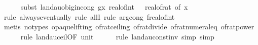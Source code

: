 \begin{isabellebody}
\ \ \ \ \isamarkupfalse%
\ {\isacharparenleft}{\kern0pt}subst\ landau{\isacharunderscore}{\kern0pt}o{\isachardot}{\kern0pt}big{\isachardot}{\kern0pt}in{\isacharunderscore}{\kern0pt}cong{\isacharbrackleft}{\kern0pt}\ g{\isacharequal}{\kern0pt}{\isachardoublequoteopen}{\isasymlambda}x{\isachardot}{\kern0pt}\ real{\isacharunderscore}{\kern0pt}of{\isacharunderscore}{\kern0pt}int\ {\isasymlceil}{}\ {\isacharslash}{\kern0pt}\ {\isacharparenleft}{\kern0pt}real{\isacharunderscore}{\kern0pt}of{\isacharunderscore}{\kern0pt}rat\ {\isacharparenleft}{\kern0pt}{\isasymdelta}{\isacharunderscore}{\kern0pt}of\ x{\isacharparenright}{\kern0pt}{\isacharparenright}{\kern0pt}\isanewline
\ \ \ \ \isamarkupfalse%
\ {\isacharparenleft}{\kern0pt}rule\ always{\isacharunderscore}{\kern0pt}eventually{\isacharcomma}{\kern0pt}\ rule\ allI{\isacharcomma}{\kern0pt}\ rule\ arg{\isacharunderscore}{\kern0pt}cong{\isacharbrackleft}{\kern0pt}\ f{\isacharequal}{\kern0pt}{\isachardoublequoteopen}real{\isacharunderscore}{\kern0pt}of{\isacharunderscore}{\kern0pt}int{\isachardoublequoteclose}{\isacharbrackright}{\kern0pt}{\isacharparenright}{\kern0pt}\ \isanewline
\ \ \ \ \ \isamarkupfalse%
\ {\isacharparenleft}{\kern0pt}metis\ {\isacharparenleft}{\kern0pt}no{\isacharunderscore}{\kern0pt}types{\isacharcomma}{\kern0pt}\ opaque{\isacharunderscore}{\kern0pt}lifting{\isacharparenright}{\kern0pt}\ of{\isacharunderscore}{\kern0pt}rat{\isacharunderscore}{\kern0pt}ceiling\ of{\isacharunderscore}{\kern0pt}rat{\isacharunderscore}{\kern0pt}divide\ of{\isacharunderscore}{\kern0pt}rat{\isacharunderscore}{\kern0pt}numeral{\isacharunderscore}{\kern0pt}eq\ of{\isacharunderscore}{\kern0pt}rat{\isacharunderscore}{\kern0pt}power{\isacharparenright}{\kern0pt}\isanewline
\ \ \ \ \isamarkupfalse%
\ {\isacharparenleft}{\kern0pt}rule\ landau{\isacharunderscore}{\kern0pt}ceil{\isacharbrackleft}{\kern0pt}OF\ unit{\isacharunderscore}{\kern0pt}{}{\isacharbrackright}{\kern0pt}{\isacharparenright}{\kern0pt}\isanewline
\ \ \ \ \isamarkupfalse%
\ {\isacharparenleft}{\kern0pt}rule\ landau{\isacharunderscore}{\kern0pt}const{\isacharunderscore}{\kern0pt}inv{\isacharcomma}{\kern0pt}\ simp{\isacharcomma}{\kern0pt}\ simp{\isacharparenright}{\kern0pt}\isanewline
\isanewline
\ \ \isamarkupfalse%

\end{isabellebody}
